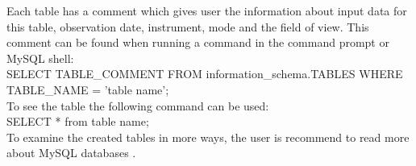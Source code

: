 Each table has a comment which gives user the information about input data for this table, observation date, instrument, mode and the field of view. This comment can be found when running a command in the command prompt or MySQL shell: \\
SELECT TABLE\_COMMENT FROM information\_schema.TABLES WHERE TABLE\_NAME = 'table name';\\
To see the table the following command can be used:\\
SELECT * from table name;\\
To examine the created tables in more ways, the user is recommend to read more about MySQL databases \cite{mysql}.

